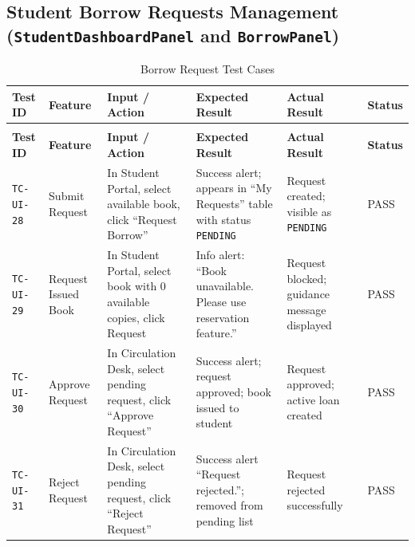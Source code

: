 \subsection{Student Borrow Requests Management (\texttt{StudentDashboardPanel} and \texttt{BorrowPanel})}
{\footnotesize
\setlength{\tabcolsep}{3pt}
\begin{longtable}{>{\raggedright\arraybackslash}p{1.6cm} >{\raggedright\arraybackslash}p{2.1cm} >{\raggedright\arraybackslash}p{2.5cm} >{\raggedright\arraybackslash}p{3.1cm} >{\raggedright\arraybackslash}p{3.1cm} >{\centering\arraybackslash}p{1.4cm}}
\caption{Borrow Request Test Cases} \label{tab:test_ui_req} \\
\toprule
\textbf{Test ID} & \textbf{Feature} & \textbf{Input / Action} & \textbf{Expected Result} & \textbf{Actual Result} & \textbf{Status} \\
\midrule
\endfirsthead
\multicolumn{6}{c}{{\bfseries Table \thetable\ continued from previous page}} \\
\toprule
\textbf{Test ID} & \textbf{Feature} & \textbf{Input / Action} & \textbf{Expected Result} & \textbf{Actual Result} & \textbf{Status} \\
\midrule
\endhead
\bottomrule
\endfoot
\texttt{TC-UI-28} & Submit Request & In Student Portal, select available book, click ``Request Borrow'' & Success alert; appears in ``My Requests'' table with status \texttt{PENDING} & Request created; visible as \texttt{PENDING} & PASS \\
\midrule
\texttt{TC-UI-29} & Request Issued Book & In Student Portal, select book with 0 available copies, click Request & Info alert: ``Book unavailable. Please use reservation feature.'' & Request blocked; guidance message displayed & PASS \\
\midrule
\texttt{TC-UI-30} & Approve Request & In Circulation Desk, select pending request, click ``Approve Request'' & Success alert; request approved; book issued to student & Request approved; active loan created & PASS \\
\midrule
\texttt{TC-UI-31} & Reject Request & In Circulation Desk, select pending request, click ``Reject Request'' & Success alert ``Request rejected.''; removed from pending list & Request rejected successfully & PASS \\
\end{longtable}
}

